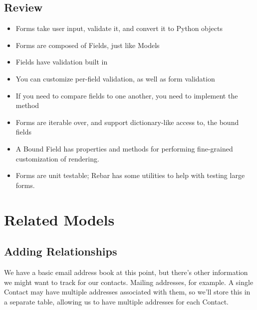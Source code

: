 \documentclass[letterpaper,10pt,english]{sphinxmanual}
\begin{document}
\section{Review}
\label{tutorial/forms:review}\begin{itemize}
\item {} 
Forms take user input, validate it, and convert it to Python objects

\item {} 
Forms are composed of Fields, just like Models

\item {} 
Fields have validation built in

\item {} 
You can customize per-field validation, as well as form validation

\item {} 
If you need to compare fields to one another, you need to implement
the  method

\item {} 
Forms are iterable over, and support dictionary-like access to, the
bound fields

\item {} 
A Bound Field has properties and methods for performing fine-grained
customization of rendering.

\item {} 
Forms are unit testable; Rebar has some utilities to help with
testing large forms.

\end{itemize}


\chapter{Related Models}
\label{tutorial/related:related-models}\label{tutorial/related::doc}\label{tutorial/related:how-errors-are-displayed}

\section{Adding Relationships}
\label{tutorial/related:adding-relationships}
We have a basic email address book at this point, but there's other
information we might want to track for our contacts. Mailing
addresses, for example. A single Contact may have multiple addresses
associated with them, so we'll store this in a separate table,
allowing us to have multiple addresses for each Contact.
\end{document}
